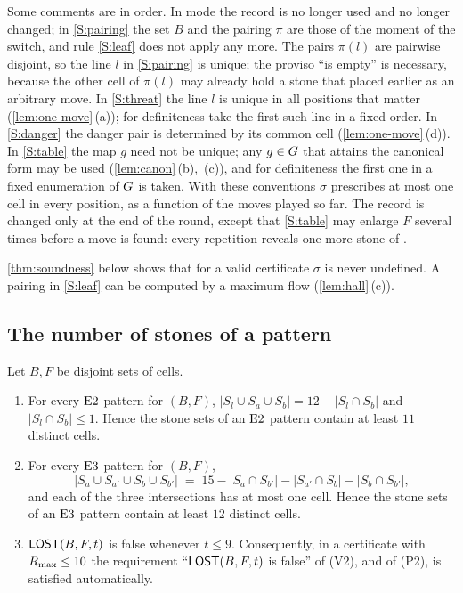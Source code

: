 Some comments are in order. In \PAIRING{} mode the record is no longer used and no longer changed; in
\ref{S:pairing} the set $B$ and the pairing $\pi$ are those of the moment of the switch, and rule
\ref{S:leaf} does not apply any more. The pairs $\pi(l)$ are pairwise
disjoint, so the line $l$ in \ref{S:pairing} is unique; the proviso ``is empty'' is necessary, because the
other cell of $\pi(l)$ may already hold a stone that \Breaker{} placed earlier as an arbitrary move. In \ref{S:threat} the line $l$ is unique in all positions that matter
(\cref{lem:one-move}\,(a)); for definiteness take the first such line in a fixed order. In
\ref{S:danger} the danger pair is determined by its common cell (\cref{lem:one-move}\,(d)). In
\ref{S:table} the map $g$ need not be unique; any $g\in G$ that attains the canonical form may be used
(\cref{lem:canon}\,(b),~(c)), and for definiteness the first one in a fixed enumeration of $G$ is taken. With these conventions $\sigma$
prescribes at most one cell in every position, as a function of the moves played so far. The record is
changed only at the end of the round, except that \ref{S:table} may enlarge $F$ several times before a move
is found: every repetition reveals one more stone of \Maker.

\cref{thm:soundness} below shows that for a valid certificate $\sigma$ is never undefined. A pairing in
\ref{S:leaf} can be computed by a maximum flow (\cref{lem:hall}\,(c)).

\subsection{The number of stones of a pattern}\label{sec:stones}

\begin{proposition}\label{prop:lost-stones}
Let $B,F$ be disjoint sets of cells.
\begin{enumerate}[label=\textup{(\alph*)},leftmargin=2.4em]
\item For every $\mathrm{E2}$ pattern for $(B,F)$,
  $|S_l\cup S_a\cup S_b| = 12-|S_l\cap S_b|$ and $|S_l\cap S_b|\le 1$. Hence the stone sets of an
  $\mathrm{E2}$ pattern contain at least $11$ distinct cells.
\item For every $\mathrm{E3}$ pattern for $(B,F)$,
  \[ |S_a\cup S_{a'}\cup S_b\cup S_{b'}| \;=\; 15-|S_a\cap S_{b'}|-|S_{a'}\cap S_b|-|S_b\cap S_{b'}|, \]
  and each of the three intersections has at most one cell. Hence the stone sets of an $\mathrm{E3}$ pattern
  contain at least $12$ distinct cells.
\item $\mathsf{LOST}(B,F,t)$ is false whenever $t\le 9$. Consequently, in a certificate with $R_{\max}\le 10$ the
  requirement ``$\mathsf{LOST}(B,F,t)$ is false'' of \textup{(V2)}, and of \textup{(P2)}, is satisfied automatically.
\end{enumerate}
\end{proposition}

